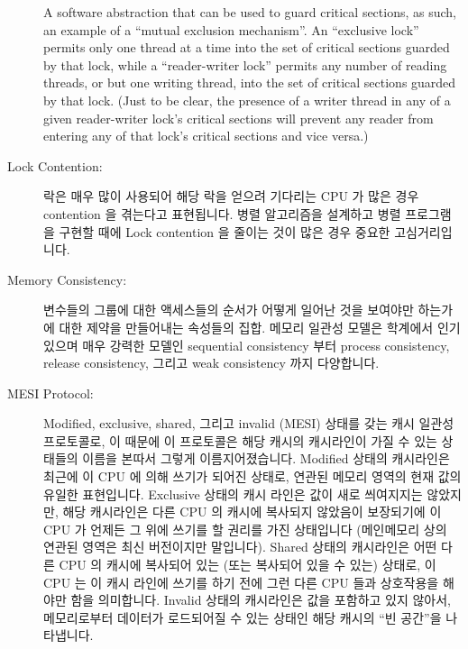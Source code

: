 \begin{description}
	A software abstraction that can be used to guard critical sections,
	as such, an example of a ``mutual exclusion mechanism''.
	An ``exclusive lock'' permits only one thread at a time into the
	set of critical sections guarded by that lock, while a
	``reader-writer lock'' permits any number of reading
	threads, or but one writing thread, into the set of critical
	sections guarded by that lock.  (Just to be clear, the presence
	of a writer thread in any of a given reader-writer lock's
	critical sections will prevent any reader from entering
	any of that lock's critical sections and vice versa.)
	\fi
\item[Lock Contention:]
	락은 매우 많이 사용되어 해당 락을 얻으려 기다리는 CPU 가 많은 경우
	contention 을 겪는다고 표현됩니다.
	병렬 알고리즘을 설계하고 병렬 프로그램을 구현할 때에 Lock contention 을
	줄이는 것이 많은 경우 중요한 고심거리입니다.
	\iffalse

	A lock is said to be suffering contention when it is being
	used so heavily that there is often a CPU waiting on it.
	Reducing lock contention is often a concern when designing
	parallel algorithms and when implementing parallel programs.
	\fi
\item[Memory Consistency:]
	변수들의 그룹에 대한 액세스들의 순서가 어떻게 일어난 것을 보여야만
	하는가에 대한 제약을 만들어내는 속성들의 집합.
	메모리 일관성 모델은 학계에서 인기있으며 매우 강력한 모델인 sequential
	consistency 부터 process consistency, release consistency, 그리고 weak
	consistency 까지 다양합니다.
	\iffalse

	A set of properties that impose constraints on the order in
	which accesses to groups of variables appear to occur.
	Memory consistency models range from sequential consistency,
	a very constraining model popular in academic circles, through
	process consistency, release consistency, and weak consistency.
	\fi
\item[MESI Protocol:]
	Modified, exclusive, shared, 그리고 invalid (MESI) 상태를 갖는 캐시
	일관성 프로토콜로, 이 때문에 이 프로토콜은 해당 캐시의 캐시라인이 가질
	수 있는 상태들의 이름을 본따서 그렇게 이름지어졌습니다.
	Modified 상태의 캐시라인은 최근에 이 CPU 에 의해 쓰기가 되어진 상태로,
	연관된 메모리 영역의 현재 값의 유일한 표현입니다.
	Exclusive 상태의 캐시 라인은 값이 새로 씌여지지는 않았지만, 해당
	캐시라인은 다른 CPU 의 캐시에 복사되지 않았음이 보장되기에 이 CPU 가
	언제든 그 위에 쓰기를 할 권리를 가진 상태입니다 (메인메모리 상의 연관된
	영역은 최신 버전이지만 말입니다).
	Shared 상태의 캐시라인은 어떤 다른 CPU 의 캐시에 복사되어 있는 (또는
	복사되어 있을 수 있는) 상태로, 이 CPU 는 이 캐시 라인에 쓰기를 하기
	전에 그런 다른 CPU 들과 상호작용을 해야만 함을 의미합니다.
	Invalid 상태의 캐시라인은 값을 포함하고 있지 않아서, 메모리로부터
	데이터가 로드되어질 수 있는 상태인 해당 캐시의 ``빈 공간''을
	나타냅니다.
	\iffalse


\end{description}
